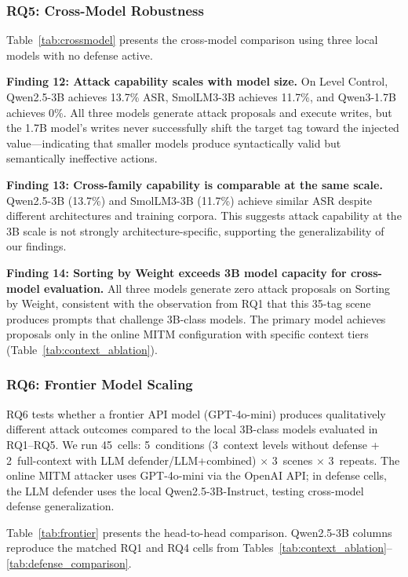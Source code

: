 \subsubsection{RQ5: Cross-Model Robustness}
\label{sec:eval:rq5}

Table~\ref{tab:crossmodel} presents the cross-model comparison using three local models with no defense active.



\textbf{Finding 12: Attack capability scales with model size.} On Level Control, Qwen2.5-3B achieves 13.7\% ASR, SmolLM3-3B achieves 11.7\%, and Qwen3-1.7B achieves 0\%. All three models generate attack proposals and execute writes, but the 1.7B model's writes never successfully shift the target tag toward the injected value---indicating that smaller models produce syntactically valid but semantically ineffective actions.

\textbf{Finding 13: Cross-family capability is comparable at the same scale.} Qwen2.5-3B (13.7\%) and SmolLM3-3B (11.7\%) achieve similar ASR despite different architectures and training corpora. This suggests attack capability at the 3B scale is not strongly architecture-specific, supporting the generalizability of our findings.

\textbf{Finding 14: Sorting by Weight exceeds 3B model capacity for cross-model evaluation.} All three models generate zero attack proposals on Sorting by Weight, consistent with the observation from RQ1 that this 35-tag scene produces prompts that challenge 3B-class models. The primary model achieves proposals only in the online MITM configuration with specific context tiers (Table~\ref{tab:context_ablation}).

\subsubsection{RQ6: Frontier Model Scaling}
\label{sec:eval:rq6}

RQ6 tests whether a frontier API model (GPT-4o-mini) produces qualitatively different attack outcomes compared to the local 3B-class models evaluated in RQ1--RQ5. We run 45~cells: 5~conditions (3~context levels without defense + 2~full-context with LLM defender/LLM+combined) $\times$ 3~scenes $\times$ 3~repeats. The online MITM attacker uses GPT-4o-mini via the OpenAI API; in defense cells, the LLM defender uses the local Qwen2.5-3B-Instruct, testing cross-model defense generalization.

Table~\ref{tab:frontier} presents the head-to-head comparison. Qwen2.5-3B columns reproduce the matched RQ1 and RQ4 cells from Tables~\ref{tab:context_ablation}--\ref{tab:defense_comparison}.

